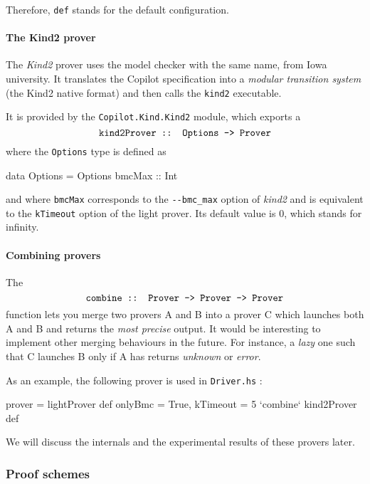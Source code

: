 Therefore, \texttt{def} stands for the default configuration.

\paragraph{The Kind2 prover}\label{the-kind2-prover}

The \emph{Kind2} prover uses the model checker with the same name, from
Iowa university. It translates the Copilot specification into a
\emph{modular transition system} (the Kind2 native format) and then
calls the \texttt{kind2} executable.

It is provided by the \texttt{Copilot.Kind.Kind2} module, which exports
a $$\texttt{kind2Prover :: Options -\textgreater{} Prover}$$ where the
\texttt{Options} type is defined as

\begin{code}
data Options = Options { bmcMax :: Int }
\end{code}

and where \texttt{bmcMax} corresponds to the \texttt{-\/-bmc\_max}
option of \emph{kind2} and is equivalent to the \texttt{kTimeout} option
of the light prover. Its default value is 0, which stands for infinity.

\paragraph{Combining provers}\label{combining-provers}

The
$$\texttt{combine :: Prover -\textgreater{} Prover -\textgreater{} Prover}$$
function lets you merge two provers A and B into a prover C which
launches both A and B and returns the \emph{most precise} output. It
would be interesting to implement other merging behaviours in the
future. For instance, a \emph{lazy} one such that C launches B only if A
has returns \emph{unknown} or \emph{error}.

As an example, the following prover is used in \texttt{Driver.hs} :

\begin{code}
prover =
  lightProver def {onlyBmc = True, kTimeout = 5} 
  `combine` kind2Prover def
\end{code}

We will discuss the internals and the experimental results of these
provers later.

\subsubsection{Proof schemes}\label{proof-schemes}

